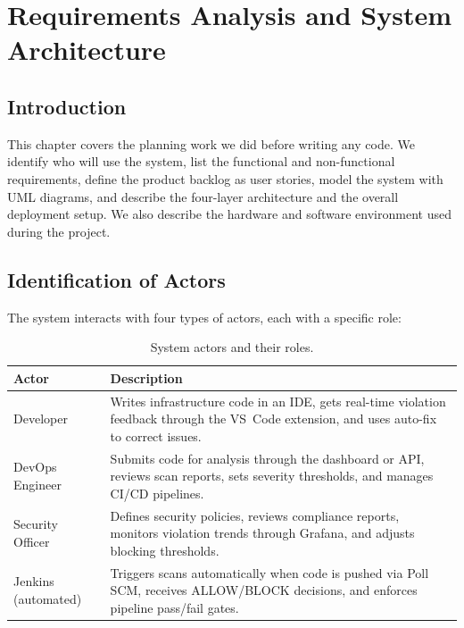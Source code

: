 
\chapter{Requirements Analysis and System Architecture}
\label{chap:planning}

\section{Introduction}

This chapter covers the planning work we did before writing any code. We identify who will use the system, list the functional and non-functional requirements, define the product backlog as user stories, model the system with UML diagrams, and describe the four-layer architecture and the overall deployment setup. We also describe the hardware and software environment used during the project.


\section{Identification of Actors}
\label{sec:actors}

The system interacts with four types of actors, each with a specific role:

\begin{table}[H]
\centering
\begin{tabularx}{\textwidth}{|l|X|}
\hline
\textbf{Actor} & \textbf{Description} \\
\hline
Developer & Writes infrastructure code in an IDE, gets real-time violation feedback through the VS~Code extension, and uses auto-fix to correct issues. \\
\hline
DevOps Engineer & Submits code for analysis through the dashboard or API, reviews scan reports, sets severity thresholds, and manages CI/CD pipelines. \\
\hline
Security Officer & Defines security policies, reviews compliance reports, monitors violation trends through Grafana, and adjusts blocking thresholds. \\
\hline
Jenkins (automated) & Triggers scans automatically when code is pushed via Poll SCM, receives ALLOW/BLOCK decisions, and enforces pipeline pass/fail gates. \\
\hline
\end{tabularx}
\caption{System actors and their roles.}
\label{tab:actors}
\end{table}


